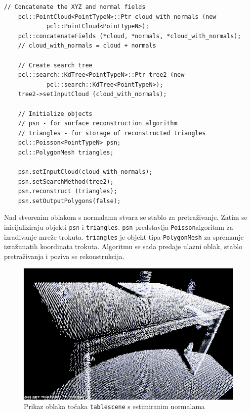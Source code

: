 \newpage
\begin{lstlisting}[label=lstIzradivanje2,caption={Dio izvornog koda iz
funkcije \texttt{reconstruct\_mesh()} }]
    // Concatenate the XYZ and normal fields
    pcl::PointCloud<PointTypeN>::Ptr cloud_with_normals (new
            pcl::PointCloud<PointTypeN>);
    pcl::concatenateFields (*cloud, *normals, *cloud_with_normals);
    // cloud_with_normals = cloud + normals

    // Create search tree 
    pcl::search::KdTree<PointTypeN>::Ptr tree2 (new
            pcl::search::KdTree<PointTypeN>);
    tree2->setInputCloud (cloud_with_normals);

    // Initialize objects 
    // psn - for surface reconstruction algorithm
    // triangles - for storage of reconstructed triangles
    pcl::Poisson<PointTypeN> psn;
    pcl::PolygonMesh triangles;

    psn.setInputCloud(cloud_with_normals);
    psn.setSearchMethod(tree2);
    psn.reconstruct (triangles);
    psn.setOutputPolygons(false);
\end{lstlisting}

Nad stvorenim oblakom s normalama stvara se stablo za pretraživanje.
Zatim se inicijaliziraju objekti \texttt{psn} i \texttt{triangles}.
\texttt{psn} predstavlja \texttt{Poisson}\footnotemark[5] algoritam za
izrađivanje mreže trokuta. \texttt{triangles} je objekt tipa
\texttt{PolygonMesh} za spremanje izražunatih koordinata trokuta.
Algoritmu se sada predaje ulazni oblak, stablo pretraživanja i poziva se
rekonstrukcija.


\begin{figure}[h]
\centering
\includegraphics[scale=0.5]{figures/tablescene-normals.png}
\caption{Prikaz oblaka točaka \texttt{tablescene} s estimiranim
normalama }
\label{fig:tablescene-normals}
\end{figure}

